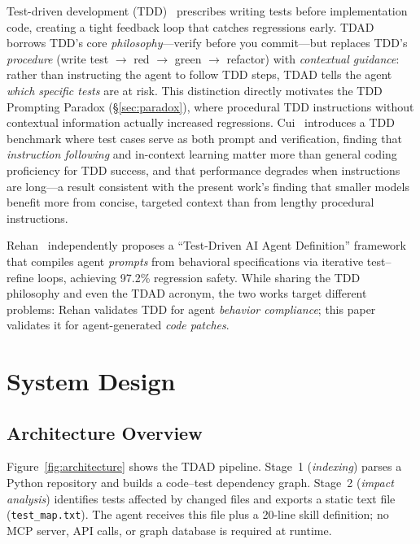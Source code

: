 \documentclass[sigconf,nonacm]{acmart}
\begin{document}
Test-driven development (TDD)~\cite{beck2003tdd} prescribes writing tests
before implementation code, creating a tight feedback loop that catches
regressions early.  \textsc{TDAD} borrows TDD's core \emph{philosophy}---verify
before you commit---but replaces TDD's \emph{procedure} (write test $\to$ red
$\to$ green $\to$ refactor) with \emph{contextual guidance}: rather than
instructing the agent to follow TDD steps, \textsc{TDAD} tells the agent
\emph{which specific tests} are at risk.  This distinction directly motivates
the TDD Prompting Paradox (\S\ref{sec:paradox}), where procedural TDD
instructions without contextual information actually increased regressions.
Cui~\cite{cui2025testsasprompt} introduces a TDD benchmark where test cases
serve as both prompt and verification, finding that \emph{instruction following}
and in-context learning matter more than general coding proficiency for TDD
success, and that performance degrades when instructions are long---a result
consistent with the present work's finding that smaller models benefit more
from concise, targeted context than from lengthy procedural instructions.

Rehan~\cite{rehan2026tdad} independently proposes a ``Test-Driven AI Agent
Definition'' framework that compiles agent \emph{prompts} from behavioral
specifications via iterative test--refine loops, achieving 97.2\% regression
safety.  While sharing the TDD philosophy and even the TDAD acronym, the two
works target different problems: Rehan validates TDD for agent \emph{behavior
compliance}; this paper validates it for agent-generated \emph{code patches}.


\section{System Design}
\label{sec:design}

\subsection{Architecture Overview}

Figure~\ref{fig:architecture} shows the \textsc{TDAD} pipeline.  Stage~1
(\emph{indexing}) parses a Python repository and builds a code--test
dependency graph.  Stage~2 (\emph{impact analysis}) identifies tests affected
by changed files and exports a static text file (\texttt{test\_map.txt}).
The agent receives this file plus a 20-line skill definition; no MCP server,
API calls, or graph database is required at runtime.
\end{document}
